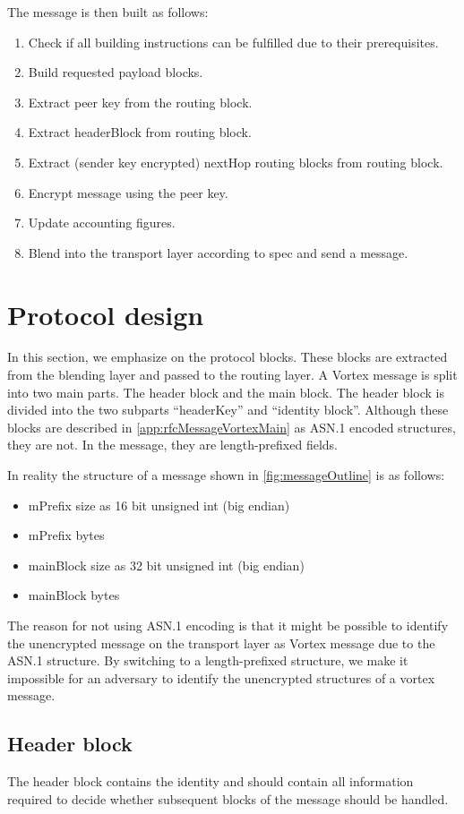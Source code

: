 The message is then built as follows:
\begin{enumerate}
	\item Check if all building instructions can be fulfilled due to their prerequisites.
	\item Build requested payload blocks.
	\item Extract peer key from the routing block.
	\item Extract headerBlock from routing block.
	\item Extract (sender key encrypted) nextHop routing blocks from routing block.
	\item Encrypt message using the peer key.
	\item Update accounting figures.
	\item Blend into the transport layer according to spec and send a message.
\end{enumerate}

\section{Protocol design}
In this section, we emphasize on the protocol blocks. These blocks are extracted from the blending layer and passed to the routing layer. A Vortex message is split into two main parts. The header block and the main block. The header block is divided into the two subparts ``headerKey'' and ``identity block''. Although these blocks are described in \ref{app:rfcMessageVortexMain} as ASN.1 encoded structures, they are not. In the message, they are length-prefixed fields.

In reality the structure of a message shown in \ref{fig:messageOutline} is as follows:
\begin{itemize}
	\item mPrefix size as 16 bit unsigned int (big endian)
	\item mPrefix bytes
	\item mainBlock size as 32 bit unsigned int (big endian)
	\item mainBlock bytes
\end{itemize}

The reason for not using ASN.1 encoding is that it might be possible to identify the unencrypted message on the transport layer as Vortex message due to the ASN.1 structure. By switching to a length-prefixed structure, we make it impossible for an adversary to identify the unencrypted structures of a vortex message.

\subsection{Header block}
The header block contains the identity and should contain all information required to decide whether subsequent blocks of the message should be handled.

